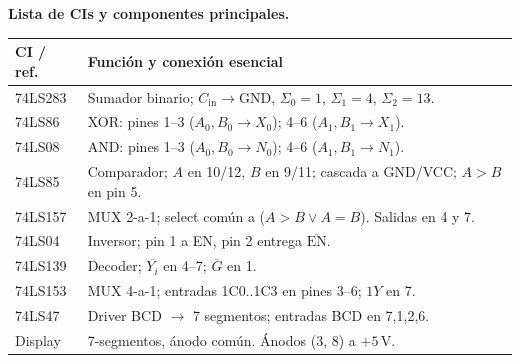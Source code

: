 \documentclass[a4paper,10pt]{article}
\begin{document}
\vspace{4pt}

\noindent
\begin{minipage}[t]{0.62\textwidth}
  \textbf{Lista de CIs y componentes principales.}
  \vspace{2pt}
  \footnotesize
  \begin{tabularx}{\linewidth}{lX}
    \toprule
    \textbf{CI / ref.}  & \textbf{Funci\'{o}n y conexi\'{o}n esencial}\\
    \midrule
    74LS283 & Sumador binario; $C_\text{in}\!\to\!\mathrm{GND}$, $\Sigma_0{=}1$, $\Sigma_1{=}4$, $\Sigma_2{=}13$.\\
    74LS86  & XOR: pines 1--3 ($A_0,B_0\!\to\!X_0$); 4--6 ($A_1,B_1\!\to\!X_1$).\\
    74LS08  & AND: pines 1--3 ($A_0,B_0\!\to\!N_0$); 4--6 ($A_1,B_1\!\to\!N_1$).\\
    74LS85  & Comparador; $A$ en 10/12, $B$ en 9/11; cascada a GND/VCC; $A > B$ en pin 5.\\
    74LS157 & MUX 2-a-1; select com\'{u}n a ($A > B \lor A = B$). Salidas en 4 y 7.\\
    74LS04  & Inversor; pin 1 a EN, pin 2 entrega $\overline{\mathrm{EN}}$.\\
    74LS139 & Decoder; $\overline{Y_i}$ en 4--7; $\overline{G}$ en 1.\\
    74LS153 & MUX 4-a-1; entradas 1C0..1C3 en pines 3--6; $1Y$ en 7.\\
    74LS47  & Driver BCD $\to$ 7 segmentos; entradas BCD en 7,1,2,6.\\
    Display & 7-segmentos, \'{a}nodo com\'{u}n. \'{A}nodos (3, 8) a $+5\,\mathrm{V}$.\\
    \bottomrule
  \end{tabularx}
\end{minipage}%
\hfill
\end{document}
